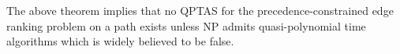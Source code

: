 The above theorem implies that no QPTAS for the precedence-constrained edge ranking problem on a path exists unless NP admits quasi-polynomial time algorithms which is widely believed to be false. 
